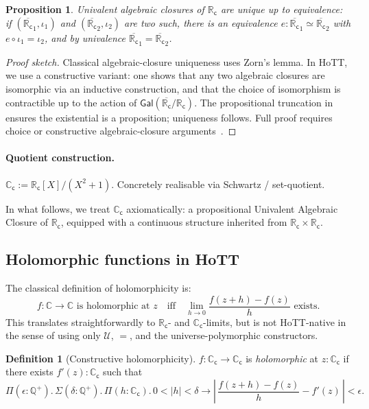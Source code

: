 \documentclass[12pt]{article}
\newtheorem{proposition}[theorem]{Proposition}
\theoremstyle{definition}
\newtheorem{definition}[theorem]{Definition}
\theoremstyle{remark}
\newcommand{\C}{\mathbb{C}}
\newcommand{\R}{\mathbb{R}}
\newcommand{\Q}{\mathbb{Q}}
\newcommand{\Type}{\mathcal{U}}
\newcommand{\Cc}{\C_{\mathsf{c}}}
\newcommand{\Rc}{\R_{\mathsf{c}}}
\begin{document}
\begin{proposition}\label{prop:UACUnique}
Univalent algebraic closures of $\Rc$ are unique up to equivalence: if
$(\overline{\Rc}_1,\iota_1)$ and $(\overline{\Rc}_2,\iota_2)$ are two such,
there is an equivalence $e:\overline{\Rc}_1 \simeq \overline{\Rc}_2$ with
$e \circ \iota_1 = \iota_2$, and by univalence
$\overline{\Rc}_1 = \overline{\Rc}_2$.
\end{proposition}

\begin{proof}[Proof sketch]
Classical algebraic-closure uniqueness uses Zorn's lemma. In HoTT, we use a
constructive variant: one shows that any two algebraic closures are
isomorphic via an inductive construction, and that the choice of isomorphism
is contractible up to the action of $\mathsf{Gal}(\overline{\Rc}/\Rc)$. The
propositional truncation in  ensures the existential is a
proposition; uniqueness follows. Full proof requires choice or constructive
algebraic-closure arguments~\cite{Mines1988}.
\end{proof}

\paragraph{Quotient construction.}
$\Cc := \Rc[X]/(X^2 + 1)$. Concretely realisable via Schwartz / set-quotient.

In what follows, we treat $\Cc$ axiomatically: a propositional Univalent
Algebraic Closure of $\Rc$, equipped with a continuous structure inherited
from $\Rc \times \Rc$.

\subsection{Holomorphic functions in HoTT}

The classical definition of holomorphicity is:
\[
f:\C \to \C \text{ is holomorphic at } z \quad\text{iff}\quad
\lim_{h \to 0} \frac{f(z+h) - f(z)}{h} \text{ exists.}
\]
This translates straightforwardly to $\Rc$- and $\Cc$-limits, but is not
HoTT-native in the sense of using only $\Type$, $=$, and the
universe-polymorphic constructors.

\begin{definition}[Constructive holomorphicity]\label{def:holo}
$f:\Cc \to \Cc$ is \emph{holomorphic} at $z:\Cc$ if there exists
$f'(z):\Cc$ such that
\[
\Pi(\epsilon:\Q^+).\,
\Sigma(\delta:\Q^+).\,
\Pi(h:\Cc).\, 0 < |h| < \delta \to
\left|\,\frac{f(z+h)-f(z)}{h} - f'(z)\,\right| < \epsilon.
\]
\end{definition}
\end{document}
